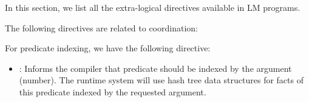 
In this section, we list all the extra-logical directives available in LM
programs.

The following directives are related to coordination:



For predicate indexing, we have the following directive:

\begin{itemize}
   \item {}: Informs the compiler that predicate 
      should be indexed by the argument  (number). The runtime system
      will use hash tree data structures for facts of this predicate indexed by
      the requested argument.
\end{itemize}
